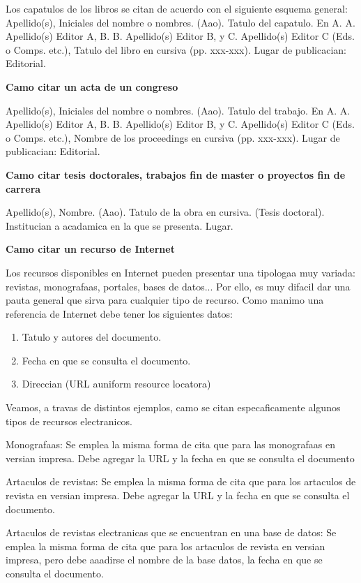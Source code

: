 \documentclass[spanish,12pt, a4paper,twoside]{paper}
\begin{document}
Los capatulos de los libros se citan de acuerdo con el siguiente esquema general:
Apellido(s), Iniciales del nombre o nombres. (Aao). Tatulo del capatulo. En A. A. Apellido(s) Editor A, B. B. Apellido(s) Editor B, y C. Apellido(s) Editor C (Eds. o Comps. etc.), Tatulo del libro en cursiva (pp. xxx-xxx). Lugar de publicacian: Editorial.

\bigskip
{\bf Camo citar un acta de un congreso}

Apellido(s), Iniciales del nombre o nombres. (Aao). Tatulo del trabajo. En A. A. Apellido(s) Editor A, B. B. Apellido(s) Editor B, y C. Apellido(s) Editor C (Eds. o Comps. etc.), Nombre de los proceedings en cursiva (pp. xxx-xxx). Lugar de publicacian: Editorial.

\bigskip
{\bf Camo citar tesis doctorales, trabajos fin de master o proyectos fin de carrera}

Apellido(s), Nombre. (Aao). Tatulo de la obra en cursiva. (Tesis doctoral). Institucian a acadamica en la que se presenta. Lugar.

\bigskip
{\bf Camo citar un recurso de Internet}

Los recursos disponibles en Internet pueden presentar una tipologaa muy variada: revistas, monografaas, portales, bases de datos... Por ello, es muy difacil dar una pauta general que sirva para cualquier tipo de recurso.
Como manimo una referencia de Internet debe tener los siguientes datos:
\begin{enumerate}
\item Tatulo y autores del documento.
\item Fecha en que se consulta el documento.
\item Direccian (URL auniform resource locatora)
\end{enumerate}

Veamos, a travas de distintos ejemplos, camo se citan especaficamente algunos tipos de recursos electranicos.

Monografaas:
Se emplea la misma forma de cita que para las monografaas en versian impresa. Debe agregar la URL y la fecha en que se consulta el documento

Artaculos de revistas:
Se emplea la misma forma de cita que para los artaculos de revista en versian impresa. Debe agregar la URL y la fecha en que se consulta el documento.

Artaculos de revistas electranicas que se encuentran en una base de datos:
Se emplea la misma forma de cita que para los artaculos de revista en versian impresa, pero debe aaadirse el nombre de la base datos, la fecha en que se consulta el documento.
\end{document}
